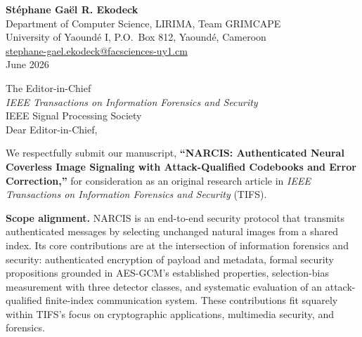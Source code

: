 \documentclass[10pt,letterpaper]{article}
\newcommand{\clhead}[1]{\textcolor{ieeeblue}{\textbf{#1}}}
\begin{document}
\begin{flushright}
\textbf{St\'ephane Ga\"el R. Ekodeck}\\
Department of Computer Science, LIRIMA, Team GRIMCAPE\\
University of Yaound\'e I, P.O.\ Box 812, Yaound\'e, Cameroon\\
\href{mailto:stephane-gael.ekodeck@facsciences-uy1.cm}%
{stephane-gael.ekodeck@facsciences-uy1.cm}\\
June 2026
\end{flushright}

The Editor-in-Chief\\
\textit{IEEE Transactions on Information Forensics and Security}\\
IEEE Signal Processing Society\\

Dear Editor-in-Chief,

We respectfully submit our manuscript, \textbf{``NARCIS: Authenticated
Neural Coverless Image Signaling with Attack-Qualified Codebooks and
Error Correction,''} for consideration as an original research article in
\textit{IEEE Transactions on Information Forensics and Security} (TIFS).

\clhead{Scope alignment.}
NARCIS is an end-to-end security protocol that transmits authenticated
messages by selecting unchanged natural images from a shared index.
Its core contributions are at the intersection of information forensics
and security: authenticated encryption of payload and metadata, formal
security propositions grounded in AES-GCM's established properties,
selection-bias measurement with three detector classes, and systematic
evaluation of an attack-qualified finite-index communication system.
These contributions fit squarely within TIFS's focus on cryptographic
applications, multimedia security, and forensics.
\end{document}
